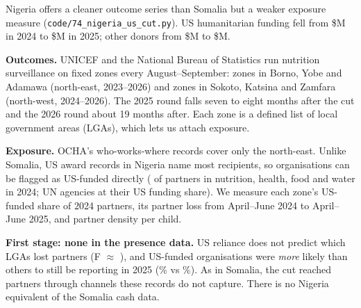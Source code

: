 \documentclass[11pt]{article}
\newcommand{\hd}[1]{\par\medskip{\sffamily\large\bfseries\color{navy}#1}\par}
\begin{document}
\hd{7. Nigeria}
Nigeria offers a cleaner outcome series than Somalia but a weaker exposure measure (\texttt{code/74\_nigeria\_us\_cut.py}). US humanitarian funding fell from \$\nngUsTf{}M in 2024 to \$\nngUsTv{}M in 2025; other donors from \$\nngOtTf{}M to \$\nngOtTv{}M.

\textbf{Outcomes.} UNICEF and the National Bureau of Statistics run nutrition surveillance on fixed zones every August--September: \nngZonesNe{} zones in Borno, Yobe and Adamawa (north-east, 2023--2026) and zones in Sokoto, Katsina and Zamfara (north-west, 2024--2026). The 2025 round falls seven to eight months after the cut and the 2026 round about 19 months after. Each zone is a defined list of local government areas (LGAs), which lets us attach exposure.

\textbf{Exposure.} OCHA's who-works-where records cover only the north-east. Unlike Somalia, US award records in Nigeria name most recipients, so organisations can be flagged as US-funded directly (\nngOrgsUs{} of \nngOrgs{} partners in nutrition, health, food and water in 2024; UN agencies at their US funding share). We measure each zone's US-funded share of 2024 partners, its partner loss from April--June 2024 to April--June 2025, and partner density per child.

\textbf{First stage: none in the presence data.} US reliance does not predict which LGAs lost partners (F $\approx$ \nngFsF), and US-funded organisations were \emph{more} likely than others to still be reporting in 2025 (\nngOrgSurvUs\% vs \nngOrgSurvNon\%). As in Somalia, the cut reached partners through channels these records do not capture. There is no Nigeria equivalent of the Somalia cash data.
\end{document}
